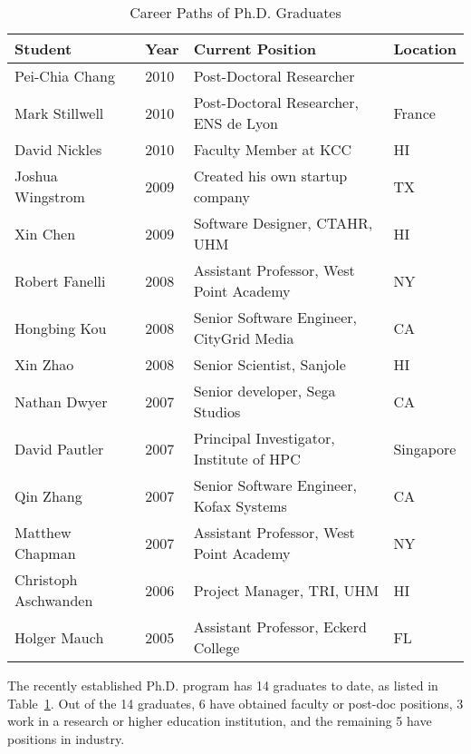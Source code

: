 \documentclass[12pt]{article}
\begin{document}
\begin{table}[Htb]
\caption{Career Paths of Ph.D. Graduates}
\label{tab.phd}
\begin{tabular}{|l|l|l|l|}
\hline
Student & Year & Current Position & Location \\
\hline
Pei-Chia Chang & 2010 & Post-Doctoral Researcher &  \\
Mark Stillwell & 2010 & Post-Doctoral Researcher, ENS de Lyon & France \\
David Nickles & 2010 & Faculty Member at KCC & HI \\
Joshua Wingstrom & 2009 & Created his own startup company & TX\\
Xin Chen & 2009 & Software Designer, CTAHR, UHM & HI\\
Robert Fanelli & 2008 & Assistant Professor, West Point Academy & NY\\
Hongbing Kou & 2008 & Senior Software Engineer, CityGrid Media &  CA\\
Xin Zhao & 2008 & Senior Scientist, Sanjole & HI\\
Nathan Dwyer & 2007 & Senior developer, Sega Studios & CA\\
David Pautler & 2007 & Principal Investigator, Institute of HPC & Singapore\\
Qin Zhang & 2007 & Senior Software Engineer, Kofax Systems & CA\\
Matthew Chapman & 2007 & Assistant Professor, West Point Academy & NY\\
Christoph Aschwanden & 2006 & Project Manager, TRI, UHM & HI\\
Holger Mauch & 2005 & Assistant Professor, Eckerd College & FL\\
\hline
\end{tabular}
\end{table}

The recently established Ph.D. program has 14 graduates to date, as
listed in Table~\ref{tab.phd}.  Out of the 14 graduates, 6 have
obtained faculty or post-doc positions, 3 work in a research or higher education
institution, and the remaining 5 have positions in industry.
\end{document}
